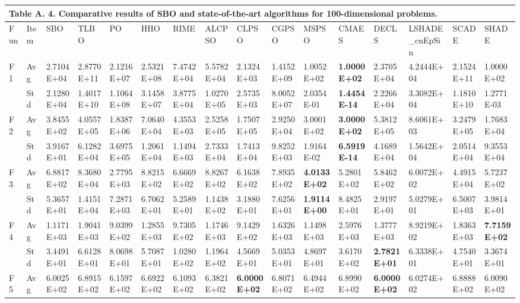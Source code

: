 \documentclass{article} %
\begin{document}
\begin{tabular}{|p{0.3in}|p{0.3in}|p{0.3in}|p{0.3in}|p{0.3in}|p{0.3in}|p{0.3in}|p{0.3in}|p{0.3in}|p{0.3in}|p{0.3in}|p{0.3in}|p{0.3in}|p{0.3in}|p{0.3in}|p{0.5in}|} \hline 
\multicolumn{16}{|p{4.8in}|}{\textbf{Table A. }4\textbf{. }Comparative results of SBO and state-of-the-art algorithms for 100-dimensional problems.\textbf{}} \\ \hline 
Fun & Item & SBO & TLBO & PO & HHO & RIME & ALCPSO & CLPSO & CGPSO & MSPSO & CMAES & DECLS & LSHADE\_cnEpSin & SCADE & SHADE \\ \hline 
F1 & Avg & 2.7104E+04 & 2.8770E+11 & 2.1216E+07 & 2.5321E+08 & 7.4742E+04 & 5.5782E+04 & 2.1324E+03 & 1.4152E+09 & 1.0052E+02 & \textbf{1.0000E+02} & 2.3705E+04 & 4.2444E+04 & 2.1524E+11 & 1.0000E+02 \\ \hline 
 & Std & 2.1280E+04 & 1.4017E+10 & 1.1064E+08 & 3.1458E+07 & 3.8775E+04 & 1.0270E+05 & 2.5735E+03 & 8.0052E+07 & 2.0354E-01 & \textbf{1.4454E-14} & 2.2266E+04 & 3.3082E+04 & 1.1810E+10 & 1.2771E-03 \\ \hline 
F2 & Avg & 3.8455E+02 & 4.0557E+05 & 1.8387E+06 & 7.0640E+04 & 4.3553E+03 & 2.5258E+05 & 1.7507E+05 & 2.9250E+04 & 3.0001E+02 & \textbf{3.0000E+02} & 5.3812E+05 & 8.6061E+03 & 3.2479E+05 & 1.7683E+04 \\ \hline 
 & Std & 3.9167E+01 & 6.1282E+04 & 3.6975E+05 & 1.2061E+04 & 1.1494E+03 & 2.7333E+04 & 1.7413E+04 & 9.8252E+03 & 1.9164E-02 & \textbf{6.5919E-14} & 4.1689E+04 & 1.5642E+04 & 2.0514E+04 & 9.3553E+04 \\ \hline 
F3 & Avg & 6.8817E+02 & 8.3680E+04 & 2.7795E+03 & 8.8215E+02 & 6.6669E+02 & 8.8267E+02 & 6.1638E+02 & 7.8935E+02 & \textbf{4.0133E+02} & 5.2801E+02 & 5.8462E+02 & 6.0072E+02 & 4.4915E+04 & 5.7237E+02 \\ \hline 
 & Std & 5.3657E+01 & 1.4151E+04 & 7.2871E+03 & 6.7062E+01 & 5.2589E+01 & 1.1438E+02 & 3.1880E+01 & 7.6256E+01 & \textbf{1.9114E+00} & 8.4825E+01 & 2.9197E+01 & 5.0279E+01 & 6.5007E+03 & 3.9814E+01 \\ \hline 
F4 & Avg & 1.1171E+03 & 1.9041E+03 & 9.0399E+02 & 1.2855E+03 & 9.7305E+02 & 1.1746E+03 & 9.1429E+02 & 1.6326E+03 & 1.1498E+03 & 2.5976E+03 & 1.3777E+03 & 8.9219E+02 & 1.8363E+03 & \textbf{7.7159E+02} \\ \hline 
 & Std & 3.4491E+01 & 6.6128E+01 & 8.0698E+01 & 5.7087E+01 & 1.0280E+02 & 1.1964E+02 & 4.5669E+01 & 5.0353E+01 & 4.8697E+01 & 3.6170E+02 & \textbf{2.7821E+01} & 6.3338E+01 & 4.7540E+01 & 3.3674E+01 \\ \hline 
F5 & Avg & 6.0025E+02 & 6.8915E+02 & 6.1597E+02 & 6.6922E+02 & 6.1093E+02 & 6.3821E+02 & \textbf{6.0000E+02} & 6.8071E+02 & 6.4944E+02 & 6.8990E+02 & \textbf{6.0000E+02} & 6.0274E+02 & 6.8888E+02 & 6.0090E+02 \\ \hline 

\end{tabular}
\end{document}
